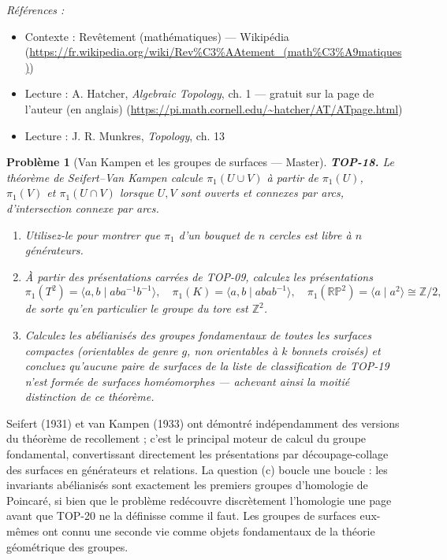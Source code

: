 \documentclass[11pt]{article}
\newtheorem{problem}{Problème}
\newenvironment{refs}{\par\small\noindent\emph{Références :}\begin{itemize}\setlength\itemsep{0pt}}{\end{itemize}\normalsize}
\begin{document}
\begin{refs}
\item Contexte : Revêtement (mathématiques) --- Wikipédia (\url{https://fr.wikipedia.org/wiki/Rev%C3%AAtement_(math%C3%A9matiques)})
\item Lecture : A. Hatcher, \textit{Algebraic Topology}, ch. 1 --- gratuit sur la page de l'auteur (en anglais) (\url{https://pi.math.cornell.edu/~hatcher/AT/ATpage.html})
\item Lecture : J. R. Munkres, \textit{Topology}, ch. 13
\end{refs}

\bigskip

\begin{problem}[{Van Kampen et les groupes de surfaces --- Master}]
\textbf{TOP-18.} Le théorème de Seifert--Van Kampen calcule $ \pi_1(U \cup V) $ à partir de
$ \pi_1(U) $, $ \pi_1(V) $ et $ \pi_1(U \cap V) $ lorsque $ U, V $ sont ouverts et connexes par
arcs, d'intersection connexe par arcs.
\begin{enumerate}
\item[(a)] Utilisez-le pour montrer que $ \pi_1 $ d'un bouquet de $ n $ cercles est libre à $ n $
générateurs.
\item[(b)] À partir des présentations carrées de TOP-09, calculez les présentations
\[ \pi_1(T^2) = \langle a, b \mid aba^{-1}b^{-1} \rangle, \quad
\pi_1(K) = \langle a, b \mid abab^{-1} \rangle, \quad
\pi_1(\mathbb{RP}^2) = \langle a \mid a^2 \rangle \cong \mathbb{Z}/2 , \]
de sorte qu'en particulier le groupe du tore est $ \mathbb{Z}^2 $.
\item[(c)] Calculez les abélianisés des groupes fondamentaux de toutes les surfaces compactes (orientables de
genre $ g $, non orientables à $ k $ bonnets croisés) et concluez qu'aucune paire de surfaces de la
liste de classification de TOP-19 n'est formée de surfaces homéomorphes --- achevant ainsi la moitié
\og{} distinction \fg{} de ce théorème.
\end{enumerate}

\end{problem}

\noindent Seifert (1931) et van Kampen (1933) ont démontré indépendamment des versions du
théorème de recollement ; c'est le principal moteur de calcul du groupe fondamental, convertissant
directement les présentations par découpage-collage des surfaces en générateurs et relations. La question
(c) boucle une boucle : les invariants abélianisés sont exactement les premiers groupes d'homologie de
Poincaré, si bien que le problème redécouvre discrètement l'homologie une page avant que TOP-20 ne la
définisse comme il faut. Les groupes de surfaces eux-mêmes ont connu une seconde vie comme objets
fondamentaux de la théorie géométrique des groupes.
\end{document}
